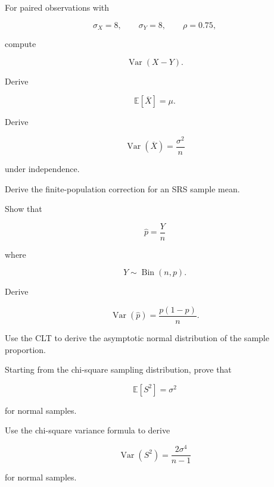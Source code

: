 \begin{exercise}[2]
For paired observations with

\[
\sigma_X=8,
\qquad
\sigma_Y=8,
\qquad
\rho=0.75,
\]

compute

\[
\operatorname{Var}(X-Y).
\]
\end{exercise}

\begin{exercise}[3]
Derive

\[
\mathbb{E}[\overline{X}]
=
\mu.
\]
\end{exercise}

\begin{exercise}[3]
Derive

\[
\operatorname{Var}(\overline{X})
=
\frac{\sigma^2}{n}
\]

under independence.
\end{exercise}

\begin{exercise}[3]
Derive the finite-population correction for an SRS sample mean.
\end{exercise}

\begin{exercise}[3]
Show that

\[
\widehat{p}
=
\frac Yn
\]

where

\[
Y\sim\operatorname{Bin}(n,p).
\]
\end{exercise}

\begin{exercise}[3]
Derive

\[
\operatorname{Var}(\widehat{p})
=
\frac{
p(1-p)
}{n}.
\]
\end{exercise}

\begin{exercise}[3]
Use the CLT to derive the asymptotic normal distribution of the sample
proportion.
\end{exercise}

\begin{exercise}[3]
Starting from the chi-square sampling distribution, prove that

\[
\mathbb{E}[S^2]=\sigma^2
\]

for normal samples.
\end{exercise}

\begin{exercise}[3]
Use the chi-square variance formula to derive

\[
\operatorname{Var}(S^2)
=
\frac{
2\sigma^4
}{
n-1
}
\]

for normal samples.
\end{exercise}

